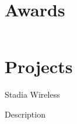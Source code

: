 \documentclass[]{deedy-resume-openfont}
\begin{document}
\begin{minipage}[t]{0.33\textwidth}
\section{Awards} 
\begin{tabular}{rll}
\end{tabular}
\sectionsep

%
%

\end{minipage} 
\hfill
\begin{minipage}[t]{0.66\textwidth}
\section{Projects}

\begin{name}Stadia Wireless\end{name}
\vspace{\topsep}
\begin{tightemize}
\item \begin{summary} Description \end{summary}
\end{tightemize}
\sectionsep



\end{minipage} 
\end{document}
